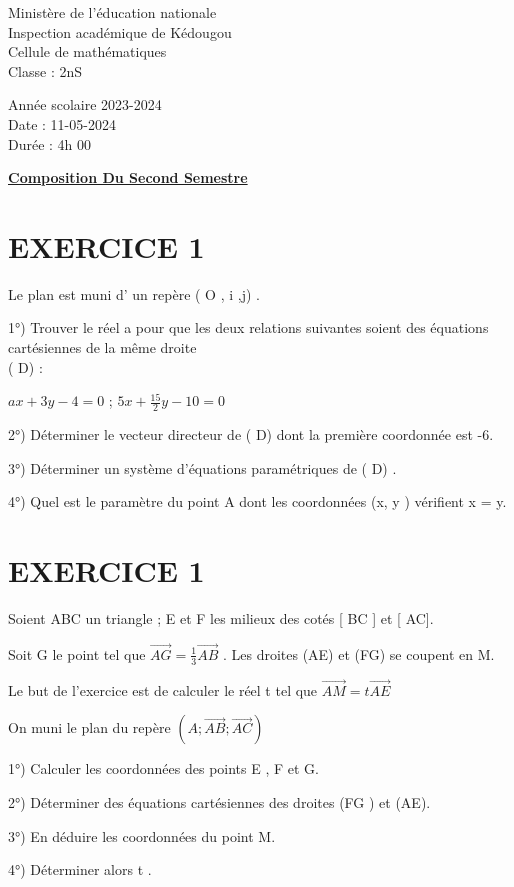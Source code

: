 \documentclass{article}
\begin{document}
\begin{minipage}{0.5\textwidth}
	Ministère de l'éducation nationale  \\
	Inspection académique de Kédougou   \\
	Cellule de mathématiques            \\
	Classe : 2nS  \\
\end{minipage}
\begin{minipage}{0.5\textwidth}
	Année scolaire 2023-2024 \\
	Date : 11-05-2024 \\
	Durée : 4h 00 \\
\end{minipage}

\begin{center}
	\textbf{{\underline{Composition Du Second Semestre}}}
\end{center}
\section*{EXERCICE 1}
Le plan est muni d’ un repère ( O , i ,j) .

1°) Trouver le réel a pour que les deux relations suivantes soient des équations cartésiennes de la même droite
\\ ( D) : 

$ax + 3y-4 =0$   ;  $5x+\frac{15}{2}y-10 = 0$

2°) Déterminer le vecteur directeur de ( D)  dont la première coordonnée est -6.

3°) Déterminer un système d’équations paramétriques de ( D) .

4°) Quel est le paramètre du point A dont les coordonnées (x, y ) vérifient x  = y.

\section*{EXERCICE 1}
Soient ABC un triangle ;  E  et F   les milieux des cotés [ BC ] et [ AC].                                                   

Soit  G  le point tel que $\overrightarrow{AG}=\frac{1}{3}\overrightarrow{AB}$  . Les droites (AE) et (FG) se coupent en M.

Le but de l’exercice est de calculer le réel t tel que $\overrightarrow{AM}=t\overrightarrow{AE}$

On muni le plan du repère $( A ;\overrightarrow{AB};\overrightarrow{AC} )$

1°) Calculer les coordonnées des points E , F  et  G.

2°) Déterminer des équations cartésiennes des droites (FG ) et  (AE).

3°) En déduire les coordonnées du point M.

4°) Déterminer alors t .
\end{document}
